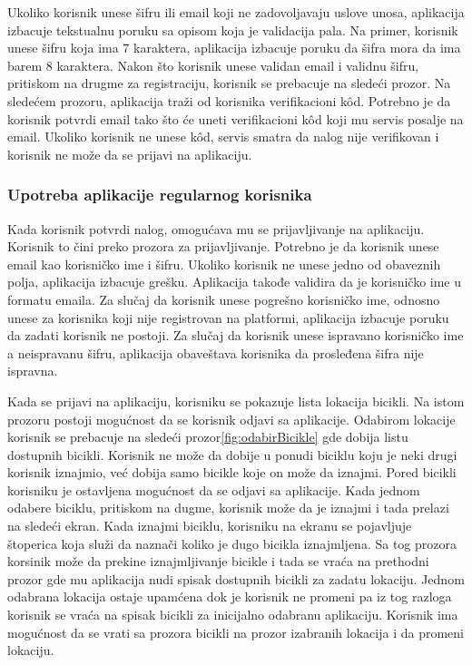 \documentclass[12pt,oneside]{memoir}
\begin{document}
 
Ukoliko korisnik unese šifru ili email koji ne zadovoljavaju uslove unosa, aplikacija izbacuje tekstualnu poruku sa opisom koja je validacija pala. Na primer, korisnik unese šifru koja ima 7 karaktera, aplikacija izbacuje poruku da šifra mora da ima barem 8 karaktera. Nakon što korisnik unese validan email i validnu šifru, pritiskom na drugme za registraciju, korisnik se prebacuje na sledeći prozor. Na sledećem prozoru, aplikacija traži od korisnika verifikacioni kôd. Potrebno je da korisnik potvrdi email tako što će uneti verifikacioni kôd koji mu servis posalje na email. Ukoliko korisnik ne unese kôd, servis smatra da nalog nije verifikovan i korisnik ne može da se prijavi na aplikaciju.
 
\subsubsection{Upotreba aplikacije regularnog korisnika}
 
Kada korisnik potvrdi nalog, omogućava mu se prijavljivanje na aplikaciju. Korisnik to čini preko prozora za prijavljivanje. Potrebno je da korisnik unese email kao korisničko ime i šifru. Ukoliko korisnik ne unese jedno od obaveznih polja, aplikacija izbacuje grešku. Aplikacija takođe validira da je korisničko ime u formatu emaila. Za slučaj da korisnik unese pogrešno korisničko ime, odnosno unese za korisnika koji nije registrovan na platformi, aplikacija izbacuje poruku da zadati korisnik ne postoji. Za slučaj da korisnik unese ispravano korisničko ime a neispravanu šifru, aplikacija obaveštava korisnika da prosleđena šifra nije ispravna.
 
Kada se prijavi na aplikaciju, korisniku se pokazuje lista lokacija bicikli. Na istom prozoru postoji mogućnost da se korisnik odjavi sa aplikacije. Odabirom lokacije korisnik se prebacuje na sledeći prozor\ref{fig:odabirBicikle} gde dobija listu dostupnih bicikli. Korisnik ne može da dobije u ponudi biciklu koju je neki drugi korisnik iznajmio, već dobija samo bicikle koje on može da iznajmi. Pored bicikli korisniku je ostavljena mogućnost da se odjavi sa aplikacije. Kada jednom odabere biciklu, pritiskom na dugme, korisnik može da je iznajmi i tada prelazi na sledeći ekran. Kada iznajmi biciklu, korisniku na ekranu se pojavljuje štoperica koja služi da naznači koliko je dugo bicikla iznajmljena. Sa tog prozora korsinik može da prekine iznajmljivanje bicikle i tada se vraća na prethodni prozor gde mu aplikacija nudi spisak dostupnih bicikli za zadatu lokaciju. Jednom odabrana lokacija ostaje upamćena dok je korisnik ne promeni pa iz tog razloga korisnik se vraća na spisak bicikli za inicijalno odabranu aplikaciju. Korisnik ima mogućnost da se vrati sa prozora bicikli na prozor izabranih lokacija i da promeni lokaciju.
 
\end{document}
